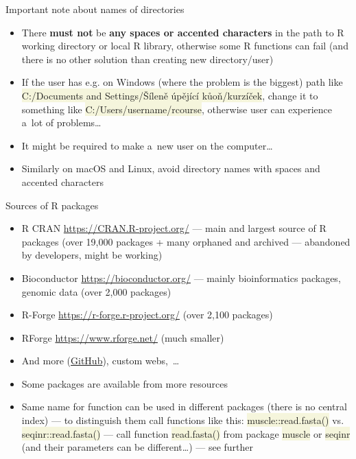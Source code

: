 \documentclass[compress, ucs, xelatex, 11pt, xcolor=svgnames, aspectratio=169,
	hyperref={
		bookmarks=true,
		unicode=true,
		colorlinks=true,
		pdftitle={Molecular data in R},
		plainpages=false,
		pdfauthor={Vojtech Zeisek},
		pdfsubject={Course about phylogeny and evolution in R},
		pdfcreator={XeLaTeX},
		pdfkeywords={R, evolution, phylogeny, molecular data},
		linkcolor=Crimson, %
		anchorcolor=Magenta, %
		citecolor=Magenta, %
		filecolor=Magenta, %
		menucolor=Magenta, %
		urlcolor=DodgerBlue, %
		pdftex},
	url={hyphens, lowtilde} %
	]{beamer}
\renewcommand{\texttt}[1]{\colorbox{Beige}{{\ttfamily #1}}}
\begin{document}
\begin{frame}{Important note about names of directories}
	\begin{itemize}
		\item \alert{There \textbf{must not} be \textbf{any spaces or accented characters} in the path to R working directory or local R library}, otherwise some R functions can fail (and there is no other solution than creating new directory/user)
		\item If the user has e.g. on Windows (where the problem is the biggest) path like \texttt{C:/Documents and Settings/Šíleně úpějící kůoň/kurzíček}, change it to something like \texttt{C:/Users/username/rcourse}, otherwise user can experience a~lot of problems\ldots
		\item It might be required to make a~new user on the computer\ldots
		\item Similarly on macOS and Linux, avoid directory names with spaces and accented characters
	\end{itemize}
\end{frame}

\begin{frame}{Sources of R packages}
	\label{sources}
	\begin{itemize}
		\item R CRAN \url{https://CRAN.R-project.org/} --- main and largest source of R packages (over 19,000 packages + many orphaned and archived --- abandoned by developers, might be working)
		\item Bioconductor \url{https://bioconductor.org/} --- mainly bioinformatics packages, genomic data (over 2,000 packages)
		\item R-Forge \url{https://r-forge.r-project.org/} (over 2,100 packages)
		\item RForge \url{https://www.rforge.net/} (much smaller)
		\item And more (\href{https://github.com/}{GitHub}), custom webs,~\ldots
		\item Some packages are available from more resources
		\item Same name for function can be used in different packages (there is no central index) --- to distinguish them call functions like this: \texttt{muscle::read.fasta()} vs. \texttt{seqinr::read.fasta()} --- call function \texttt{read.fasta()} from package \texttt{muscle} \alert{or} \texttt{seqinr} (and their parameters can be different\ldots) --- see further
	\end{itemize}
\end{frame}
\end{document}
